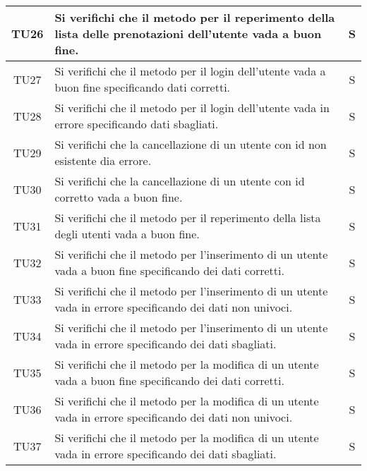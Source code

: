 \begin{center}
\begin{longtable}{|c|p{10cm}|c|}
			TU26 & Si verifichi che il metodo per il reperimento della lista delle prenotazioni dell'utente vada a buon fine. & S \\	
			\hline
			TU27 & Si verifichi che il metodo per il login dell'utente vada a buon fine specificando dati corretti. & S \\	
			\hline
			TU28 & Si verifichi che il metodo per il login dell'utente vada in errore specificando dati sbagliati. & S \\	
			\hline
			TU29 & Si verifichi che la cancellazione di un utente con id non esistente dia errore. & S \\	
			\hline
			TU30 & Si verifichi che la cancellazione di un utente con id corretto vada a buon fine. & S \\	
			\hline
			TU31 & Si verifichi che il metodo per il reperimento della lista degli utenti vada a buon fine. & S \\	
			\hline
			TU32 & Si verifichi che il metodo per l'inserimento di un utente vada a buon fine specificando dei dati corretti. & S \\	
			\hline
			TU33 & Si verifichi che il metodo per l'inserimento di un utente vada in errore specificando dei dati non univoci. & S \\	
			\hline
			TU34 & Si verifichi che il metodo per l'inserimento di un utente vada in errore specificando dei dati sbagliati. & S \\	
			\hline
			TU35 & Si verifichi che il metodo per la modifica di un utente vada a buon fine specificando dei dati corretti. & S \\	
			\hline
			TU36 & Si verifichi che il metodo per la modifica di un utente vada in errore specificando dei dati non univoci. & S \\	
			\hline
			TU37 & Si verifichi che il metodo per la modifica di un utente vada in errore specificando dei dati sbagliati. & S \\	
			\hline
			

\end{longtable}
\end{center}
